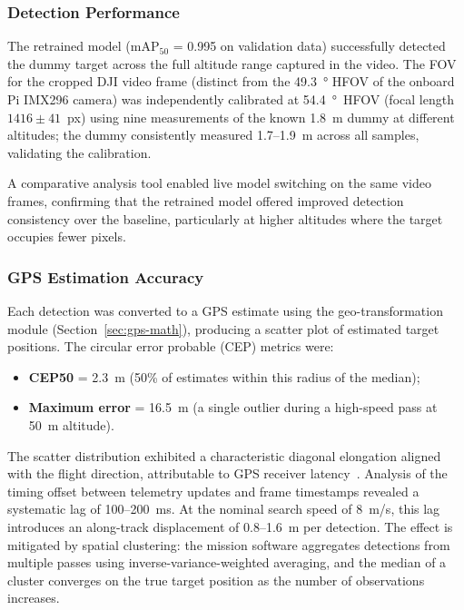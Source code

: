 \subsubsection{Detection Performance}

The retrained model (mAP$_{50}$ = 0.995 on validation data) successfully detected the dummy target across the full altitude range captured in the video. The FOV for the cropped DJI video frame (distinct from the \SI{49.3}{\degree} HFOV of the onboard Pi IMX296 camera) was independently calibrated at \SI{54.4}{\degree}~HFOV (focal length $1416 \pm 41$~px) using nine measurements of the known 1.8~m dummy at different altitudes; the dummy consistently measured 1.7--1.9~m across all samples, validating the calibration.

A comparative analysis tool enabled live model switching on the same video frames, confirming that the retrained model offered improved detection consistency over the baseline, particularly at higher altitudes where the target occupies fewer pixels.

\subsubsection{GPS Estimation Accuracy}

Each detection was converted to a GPS estimate using the geo-transformation module (Section~\ref{sec:gps-math}), producing a scatter plot of estimated target positions. The circular error probable (CEP) metrics were:

\begin{itemize}
    \item \textbf{CEP50} = 2.3~m (50\% of estimates within this radius of the median);
    \item \textbf{Maximum error} = 16.5~m (a single outlier during a high-speed pass at 50~m altitude).
\end{itemize}

The scatter distribution exhibited a characteristic diagonal elongation aligned with the flight direction, attributable to GPS receiver latency~\cite{misra2006global}. Analysis of the timing offset between telemetry updates and frame timestamps revealed a systematic lag of 100--200~ms. At the nominal search speed of 8~m/s, this lag introduces an along-track displacement of 0.8--1.6~m per detection. The effect is mitigated by spatial clustering: the mission software aggregates detections from multiple passes using inverse-variance-weighted averaging, and the median of a cluster converges on the true target position as the number of observations increases.

